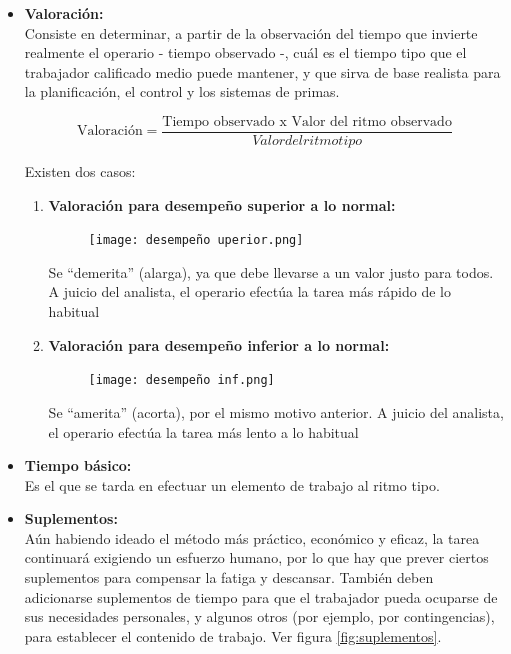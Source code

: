 \documentclass[a4paper,oneside,11pt]{article}
\begin{document}
\begin{itemize}
    \item \textbf{Valoración:}\\
    Consiste en determinar, a partir de la observación del tiempo que invierte realmente el operario - tiempo observado -, cuál es el tiempo tipo que el trabajador calificado medio puede mantener, y que sirva de base realista para la planificación, el control y los sistemas de primas.
    
    \begin{equation*}
    \text{Valoración} = \dfrac{\text{Tiempo observado x Valor del ritmo observado}}{Valor del ritmo tipo}
    \end{equation*}

    Existen dos casos:
    
    \begin{enumerate}
        \item \textbf{Valoración para desempeño superior a lo normal:}\\
        \begin{figure} [ht!]
            \centering
            \texttt{[image: desempeño uperior.png]}
        \end{figure}
        
        Se “demerita” (alarga), ya que debe llevarse a un valor justo para todos. A juicio del analista, el operario efectúa la tarea más rápido de lo habitual
        
        \item \textbf{Valoración para desempeño inferior a lo normal:} \\
        \begin{figure}[ht!]
            \centering
            \texttt{[image: desempeño inf.png]}
        \end{figure}
        
        Se “amerita” (acorta), por el mismo motivo anterior. A juicio del analista, el operario efectúa la tarea  más lento a lo habitual

    \end{enumerate}
    

    \item \textbf{Tiempo básico:}\\
    Es el que se tarda en efectuar un elemento de trabajo al ritmo tipo.

    \item \textbf{Suplementos:}\\
    Aún habiendo ideado el método más práctico, económico y eficaz, la tarea continuará exigiendo un esfuerzo humano, por lo que hay que prever ciertos suplementos para compensar la fatiga y descansar. También deben adicionarse suplementos de tiempo para que el trabajador pueda ocuparse de sus necesidades personales, y algunos otros (por ejemplo, por contingencias), para establecer el contenido de trabajo. Ver figura \ref{fig:suplementos}.
    

\end{itemize}
\end{document}
